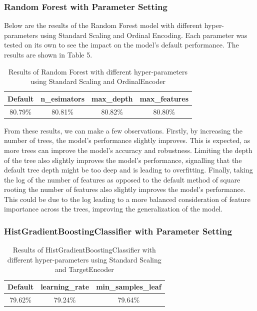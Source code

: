 \documentclass{article}
\begin{document}
\subsubsection{Random Forest with Parameter Setting}
Below are the results of the Random Forest model with different hyper-parameters using Standard Scaling and Ordinal Encoding. Each parameter was tested on its own to see the impact on the model's default performance. The results are shown in Table 5. 

\begin{table}[H]
  \centering
\begin{tabular}{|c|c|c|c|}
\hline
Default & n\_esimators & max\_depth & max\_features \\ \hline
80.79\% & 80.81\%      & 80.82\%    & 80.80\%       \\ \hline
\end{tabular}
\caption{Results of Random Forest with different hyper-parameters using Standard Scaling and OrdinalEncoder}
\end{table}

\noindent From these results, we can make a few observations. Firstly, by increasing the number of trees, the model's performance slightly improves. This is expected, as more trees can improve the model's accuracy and robustness. Limiting the depth of the tree also slightly improves the model's performance, signalling that the default tree depth might be too deep and is leading to overfitting. Finally, taking the log of the number of features as opposed to the default method of square rooting the number of features also slightly improves the model's performance. This could be due to the log leading to a more balanced consideration of feature importance across the trees, improving the generalization of the model.

\subsubsection{HistGradientBoostingClassifier with Parameter Setting}

\begin{table}[H]
  \centering
  \begin{tabular}{|c|c|c|}
    \hline
    Default & learning\_rate & min\_samples\_leaf \\ \hline
    79.62\% & 79.24\%        & 79.64\%            \\ \hline
  \end{tabular}
  \caption{Results of HistGradientBoostingClassifier with different hyper-parameters using Standard Scaling and TargetEncoder}
\end{table}
\end{document}
